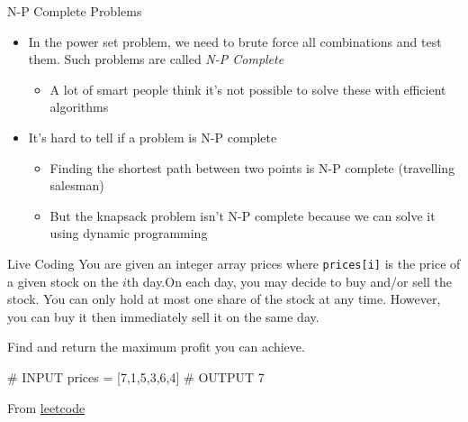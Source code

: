 \documentclass[
  ignorenonframetext,
]{beamer}
\newenvironment{Shaded}{\begin{snugshade}}{\end{snugshade}}
\newcommand{\CommentTok}[1]{\textcolor[rgb]{0.37,0.37,0.37}{#1}}
\newcommand{\DecValTok}[1]{\textcolor[rgb]{0.68,0.00,0.00}{#1}}
\newcommand{\NormalTok}[1]{\textcolor[rgb]{0.00,0.23,0.31}{#1}}
\newcommand{\OperatorTok}[1]{\textcolor[rgb]{0.37,0.37,0.37}{#1}}
\providecommand{\tightlist}{%
  \setlength{\itemsep}{0pt}\setlength{\parskip}{0pt}}\usepackage{longtable,booktabs,array}
\begin{document}
\begin{frame}{N-P Complete Problems}
\protect\hypertarget{n-p-complete-problems}{}
\begin{itemize}
\item
  In the power set problem, we need to brute force all combinations and
  test them. Such problems are called \emph{N-P Complete}

  \begin{itemize}
  \tightlist
  \item
    A lot of smart people think it's not possible to solve these with
    efficient algorithms
  \end{itemize}
\item
  It's hard to tell if a problem is N-P complete

  \begin{itemize}
  \item
    Finding the shortest path between two points is N-P complete
    (travelling salesman)
  \item
    But the knapsack problem isn't N-P complete because we can solve it
    using dynamic programming
  \end{itemize}
\end{itemize}
\end{frame}

\begin{frame}[fragile]{Live Coding}
\protect\hypertarget{live-coding}{}
You are given an integer array prices where \texttt{prices{[}i{]}} is
the price of a given stock on the \(i\)th day.On each day, you may
decide to buy and/or sell the stock. You can only hold at most one share
of the stock at any time. However, you can buy it then immediately sell
it on the same day.

Find and return the maximum profit you can achieve.

\begin{Shaded}
\begin{Highlighting}[]
\CommentTok{\# INPUT}
\NormalTok{prices }\OperatorTok{=}\NormalTok{ [}\DecValTok{7}\NormalTok{,}\DecValTok{1}\NormalTok{,}\DecValTok{5}\NormalTok{,}\DecValTok{3}\NormalTok{,}\DecValTok{6}\NormalTok{,}\DecValTok{4}\NormalTok{]}
\CommentTok{\# OUTPUT}
\DecValTok{7}
\end{Highlighting}
\end{Shaded}

From
\href{https://leetcode.com/problems/best-time-to-buy-and-sell-stock-ii/description/}{leetcode}
\end{frame}
\end{document}
